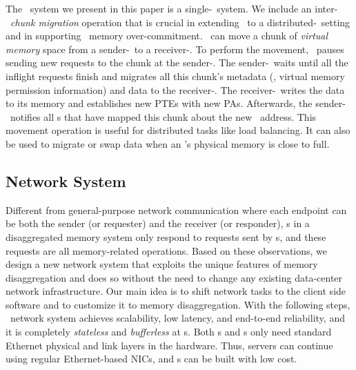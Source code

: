 The \sys\ system we present in this paper is a single-\MN\ system. 
We include an inter-\MN\ {\em chunk migration} operation that is crucial in extending \sys\ to a distributed-\MN\ setting 
and in supporting \MN\ memory over-commitment.
\sys\ can move a chunk of {\em virtual memory} space from a sender-\MN\ to a receiver-\MN.
To perform the movement, \syslib\ pauses sending new requests to the chunk at the sender-\MN.
The sender-\MN\ waits until all the inflight requests finish
and migrates all this chunk's metadata (\eg, virtual memory permission information) and data to the receiver-\MN.
The receiver-\MN\ writes the data to its memory and establishes new PTEs with new PAs.
Afterwards, the sender-\MN\ notifies all \CN{}s that have mapped this chunk about the new \MN\ address.
This movement operation is useful for distributed tasks like load balancing.
It can also be used to migrate or swap data when an \MN's physical memory is close to full.



\subsection{Network System}
\label{sec:network}

Different from general-purpose network communication where each endpoint can be both the sender (or requester) and the receiver (or responder),
\MN{}s in a disaggregated memory system only respond to requests sent by \CN{}s,
and these requests are all memory-related operations.
Based on these observations, we design a new network system that exploits the unique features of memory disaggregation
and does so without the need to change any existing data-center network infrastructure.
Our main idea is to shift network tasks to the client side software
and to customize it to memory disaggregation.
With the following steps, \sys\ network system achieves scalability, low latency, and end-to-end reliability,
and it is completely {\em stateless} and {\em bufferless} at \MN{}s.
Both \CN{}s and \MN{}s only need standard Ethernet physical and link layers in the hardware.
Thus, \CN{} servers can continue using regular Ethernet-based NICs, and \MN{}s can be built with low cost.

